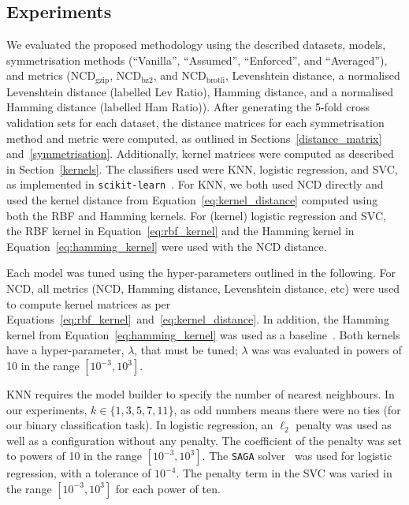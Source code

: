 \documentclass[preprint,12pt]{article}
\begin{document}
\subsection{Experiments}
\label{experiments}

We evaluated the proposed methodology using the described datasets, models, symmetrisation methods (``Vanilla'', ``Assumed'', ``Enforced'', and ``Averaged''), and metrics ($\text{NCD}_{\text{gzip}}$, $\text{NCD}_{\text{bz2}}$, and $\text{NCD}_{\text{brotli}}$, Levenshtein distance, a normalised Levenshtein distance (labelled Lev Ratio),  Hamming distance, and a normalised Hamming distance (labelled Ham Ratio)).
After generating the 5-fold cross validation sets for each dataset, the distance matrices for each symmetrisation method and metric were computed, as outlined in Sections~\ref{distance_matrix} and~\ref{symmetrisation}.
Additionally, kernel matrices were computed as described in Section~\ref{kernels}.
The classifiers used were KNN, logistic regression, and SVC, as implemented in \texttt{scikit-learn}~\cite{sklearn}.
For KNN, we both used NCD directly and used the kernel distance from Equation~\ref{eq:kernel_distance} computed using both the RBF and Hamming kernels.
For (kernel) logistic regression and SVC, the RBF kernel in Equation~\ref{eq:rbf_kernel} and the Hamming kernel in Equation~\ref{eq:hamming_kernel} were used with the NCD distance.

Each model was tuned using the hyper-parameters outlined in the following.
For NCD, all metrics (NCD, Hamming distance, Levenshtein distance, etc) were used to compute kernel matrices as per Equations~\ref{eq:rbf_kernel}~and~\ref{eq:kernel_distance}.
In addition, the Hamming kernel from Equation~\ref{eq:hamming_kernel} was used as a baseline~\cite{hamming_kernel}.
Both kernels have a hyper-parameter, $\lambda$, that must be tuned; $\lambda$ was was evaluated in powers of 10 in the range $[10^{-3}, 10^3]$.

KNN requires the model builder to specify the number of nearest neighbours.
In our experiments, $k \in \{1,3,5,7,11\}$, as odd numbers means there were no ties (for our binary classification task).
In logistic regression, an $\ell_2$ penalty was used as well as a configuration without any penalty.
The coefficient of the penalty was set to powers of 10 in the range $[10^{-3}, 10^3]$.
The \texttt{SAGA} solver~\cite{saga} was used for logistic regression, with a tolerance of $10^{-4}$.
The penalty term in the SVC was varied in the range $[10^{-3}, 10^3]$ for each power of ten.
\end{document}
